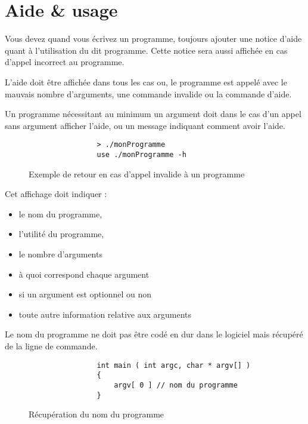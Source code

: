 	\section{Aide \& usage}
		Vous devez quand vous écrivez un programme, toujours ajouter une notice d'aide quant à l'utilisation du dit programme. Cette notice sera aussi affichée en cas d'appel incorrect au programme.

		L'aide doit être affichée dans tous les cas ou, le programme est appelé avec le mauvais nombre d'arguments, une commande invalide ou la commande d'aide.

		Un programme nécessitant au minimum un argument doit dans le cas d'un appel sans argument afficher l'aide, ou un message indiquant comment avoir l'aide.

		\begin{figure}[H]
			\begin{changemargin}{-2.5cm}{-2.5cm}
			\begin{tcolorbox}
			\begin{verbatim}
				> ./monProgramme
				use ./monProgramme -h
			\end{verbatim}
			\end{tcolorbox}
			\end{changemargin}
			\caption{Exemple de retour en cas d'appel invalide à un programme}
		\end{figure}

		Cet affichage doit indiquer : 
		\begin{itemize}
			\item le nom du programme,
			\item l'utilité du programme,
			\item le nombre d'arguments
			\item à quoi correspond chaque argument
			\item si un argument est optionnel ou non
			\item toute autre information relative aux arguments
		\end{itemize}

		Le nom du programme ne doit pas être codé en dur dans le logiciel mais récupéré de la ligne de commande.

		\begin{figure}[H]
			\begin{changemargin}{-2.5cm}{-2.5cm}
			\begin{tcolorbox}
			\begin{verbatim}
				int main ( int argc, char * argv[] )
				{
				    argv[ 0 ] // nom du programme
				}
			\end{verbatim}
			\end{tcolorbox}
			\end{changemargin}
			\caption{Récupération du nom du programme}
		\end{figure}


